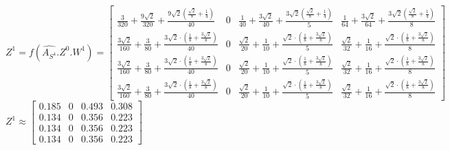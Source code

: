 \documentclass[a4paper]{article}
\begin{document}
$Z^{1} = f(\hat{A_{S^4}}.Z^{0}. W^{1}) =  \left[\begin{matrix}\frac{3}{320} + \frac{9 \sqrt{2}}{320} + \frac{9 \sqrt{2} \left(\frac{\sqrt{2}}{8} + \frac{1}{4}\right)}{40} & 0 & \frac{1}{40} + \frac{3 \sqrt{2}}{40} + \frac{3 \sqrt{2} \left(\frac{\sqrt{2}}{8} + \frac{1}{4}\right)}{5} & \frac{1}{64} + \frac{3 \sqrt{2}}{64} + \frac{3 \sqrt{2} \left(\frac{\sqrt{2}}{8} + \frac{1}{4}\right)}{8}\\\frac{3 \sqrt{2}}{160} + \frac{3}{80} + \frac{3 \sqrt{2} \cdot \left(\frac{1}{8} + \frac{3 \sqrt{2}}{8}\right)}{40} & 0 & \frac{\sqrt{2}}{20} + \frac{1}{10} + \frac{\sqrt{2} \cdot \left(\frac{1}{8} + \frac{3 \sqrt{2}}{8}\right)}{5} & \frac{\sqrt{2}}{32} + \frac{1}{16} + \frac{\sqrt{2} \cdot \left(\frac{1}{8} + \frac{3 \sqrt{2}}{8}\right)}{8}\\\frac{3 \sqrt{2}}{160} + \frac{3}{80} + \frac{3 \sqrt{2} \cdot \left(\frac{1}{8} + \frac{3 \sqrt{2}}{8}\right)}{40} & 0 & \frac{\sqrt{2}}{20} + \frac{1}{10} + \frac{\sqrt{2} \cdot \left(\frac{1}{8} + \frac{3 \sqrt{2}}{8}\right)}{5} & \frac{\sqrt{2}}{32} + \frac{1}{16} + \frac{\sqrt{2} \cdot \left(\frac{1}{8} + \frac{3 \sqrt{2}}{8}\right)}{8}\\\frac{3 \sqrt{2}}{160} + \frac{3}{80} + \frac{3 \sqrt{2} \cdot \left(\frac{1}{8} + \frac{3 \sqrt{2}}{8}\right)}{40} & 0 & \frac{\sqrt{2}}{20} + \frac{1}{10} + \frac{\sqrt{2} \cdot \left(\frac{1}{8} + \frac{3 \sqrt{2}}{8}\right)}{5} & \frac{\sqrt{2}}{32} + \frac{1}{16} + \frac{\sqrt{2} \cdot \left(\frac{1}{8} + \frac{3 \sqrt{2}}{8}\right)}{8}\end{matrix}\right]$
$Z^{1}  \approx \begin{bmatrix}
    0.185 &  0 &  0.493 &  0.308\\
    0.134 &  0 &  0.356 &  0.223\\
    0.134 &  0 &  0.356 &  0.223\\
    0.134 &  0 &  0.356 &  0.223
\end{bmatrix}$

% 
\end{document}
